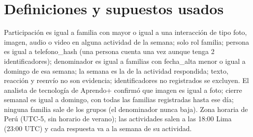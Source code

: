 \documentclass[12pt,a4paper]{article}
\begin{document}
		\begin{tcolorbox}[colback = main!40, colframe = main!40]
			
		\end{tcolorbox}
		\begin{tcolorbox}[colback = main!40, colframe = main!40]
			
		\end{tcolorbox}
		\begin{tcolorbox}[colback = main!40, colframe = main!40]
			
		\end{tcolorbox}
		\begin{tcolorbox}[colback = main!40, colframe = main!40]
			
		\end{tcolorbox}
		\begin{tcolorbox}[colback = main!40, colframe = main!40]
			
		\end{tcolorbox}

	\label{key}
	\section{Definiciones y supuestos usados}
	\noindent Participación es igual a familia con mayor o igual a una interacción de tipo
	foto, imagen, audio o video en alguna actividad de la semana;
	solo rol familia; persona es igual a telefono\_hash (una persona cuenta una vez aunque tenga 2 identificadores); 
	denominador es igual a familias con fecha\_alta menor o igual a domingo de esa
	semana; la semana es la de la actividad respondida; texto, reacción y reenvío no son evidencia;
	identificadores no registrados se excluyen. El analista de tecnología de Aprendo+ confirmó que  
	imagen es igual a foto; cierre semanal es igual a domingo, con todas las familias registradas hasta ese día;
	ninguna familia sale de los grupos (el denominador nunca baja). Zona horaria de Perú (UTC-5, sin
	horario de verano); las actividades salen a las 18:00
	Lima (23:00 UTC) y cada respuesta va a la semana de su actividad.
	
	
\end{document}
